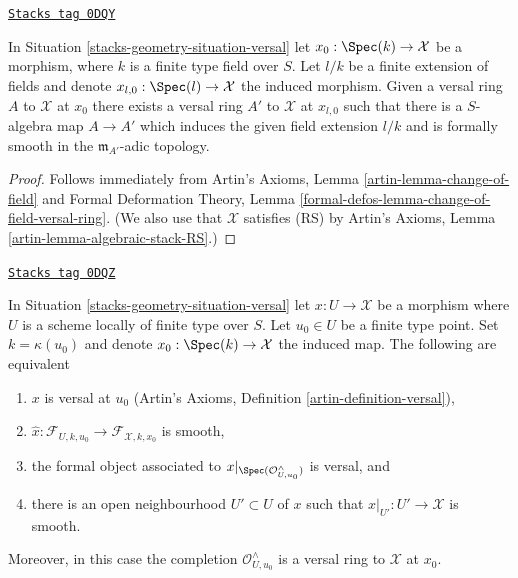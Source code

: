 \begin{lemma}
\label{stacks-geometry-lemma-versal-ring-field-extension}
\href{https://stacks.math.columbia.edu/tag/0DQY}{\texttt{Stacks tag 0DQY}}

In Situation \ref{stacks-geometry-situation-versal} let $x_0 : \Spec(k) \to \mathcal{X}$
be a morphism, where $k$ is a finite type field over $S$.
Let $l/k$ be a finite extension of fields and denote
$x_{l, 0} : \Spec(l) \to \mathcal{X}$ the induced morphism.
Given a versal ring $A$ to $\mathcal{X}$ at $x_0$ there exists
a versal ring $A'$ to $\mathcal{X}$ at $x_{l, 0}$ such that
there is a $S$-algebra map $A \to A'$ which induces the given
field extension $l/k$ and is formally smooth in the $\mathfrak m_{A'}$-adic
topology.
\end{lemma}

\begin{proof}
Follows immediately from
Artin's Axioms, Lemma \ref{artin-lemma-change-of-field}
and
Formal Deformation Theory, Lemma
\ref{formal-defos-lemma-change-of-field-versal-ring}.
(We also use that $\mathcal{X}$ satisfies (RS) by
Artin's Axioms, Lemma \ref{artin-lemma-algebraic-stack-RS}.)
\end{proof}

\begin{lemma}
\label{stacks-geometry-lemma-compare-versal-ring-completion}
\href{https://stacks.math.columbia.edu/tag/0DQZ}{\texttt{Stacks tag 0DQZ}}

In Situation \ref{stacks-geometry-situation-versal} let $x : U \to \mathcal{X}$ be a
morphism where $U$ is a scheme locally of finite type over $S$.
Let $u_0 \in U$ be a finite type point.
Set $k = \kappa(u_0)$ and denote $x_0 : \Spec(k) \to \mathcal{X}$
the induced map. The following are equivalent
\begin{enumerate}
\item $x$ is versal at $u_0$
(Artin's Axioms, Definition \ref{artin-definition-versal}),
\item $\hat x : \mathcal{F}_{U, k, u_0} \to \mathcal{F}_{\mathcal{X}, k, x_0}$
is smooth,
\item the formal object associated to
$x|_{\Spec(\mathcal{O}_{U, u_0}^\wedge)}$ is versal, and
\item there is an open neighbourhood $U' \subset U$ of $x$ such that
$x|_{U'} : U' \to \mathcal{X}$ is smooth.
\end{enumerate}
Moreover, in this case the completion $\mathcal{O}_{U, u_0}^\wedge$
is a versal ring to $\mathcal{X}$ at $x_0$.
\end{lemma}

